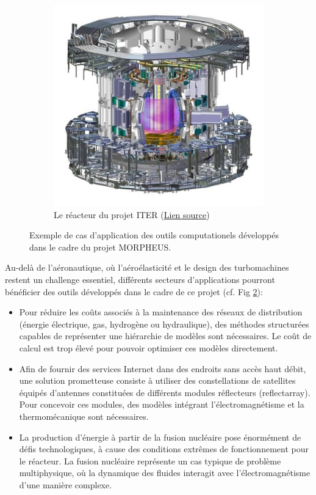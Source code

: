 \documentclass[12pt, french]{article}
\begin{document}
\begin{figure}[t]
\begin{subfigure}[t]{0.25\textwidth}
		\includegraphics[width=\columnwidth]{tcws.jpg}%
		\caption{Le réacteur du projet ITER (\href{https://www.iter.org/newsline/-/1119}{Lien source})}
		\label{fig:sofi-mit}
	\end{subfigure}
	\caption[]{Exemple de cas d’application des outils computationels développés dans le cadre du projet MORPHEUS.}%
	\label{fig:applications}%
\end{figure}

Au-delà de l’aéronautique, où l’aéroélasticité et le design des turbomachines restent un challenge essentiel, différents secteurs d’applications pourront bénéficier des outils développés
dans le cadre de ce projet (cf. Fig \ref{fig:applications}): \\
\begin{itemize}
	\item Pour réduire les coûts associés à la maintenance des réseaux de distribution (énergie
	électrique, gas, hydrogène ou hydraulique), des méthodes structurées capables de représenter une hiérarchie de modèles sont nécessaires. Le coût de calcul est trop élevé pour pouvoir optimiser ces modèles directement.
	\item Afin de fournir des services Internet dans des endroits sans accès haut débit, une
	solution prometteuse consiste à utiliser des constellations de satellites équipés d'antennes constituées de différents modules réflecteurs (reflectarray). Pour concevoir ces modules, des modèles intégrant l’électromagnétisme et la thermomécanique sont nécessaires.
	\item  La production d’énergie à partir de la fusion nucléaire pose énormément de défis
	technologiques, à cause des conditions extrêmes de fonctionnement pour le réacteur. La fusion nucléaire représente un cas typique de problème multiphysique, où la dynamique des fluides interagit avec l’électromagnétisme d’une manière complexe.
\end{itemize}
\end{document}
